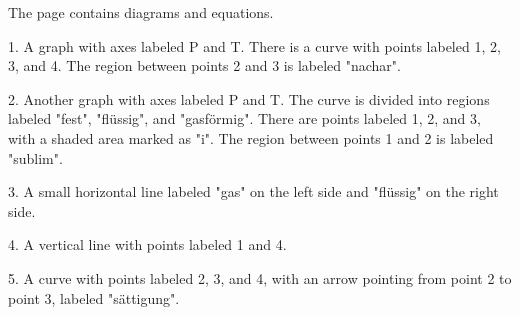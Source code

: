 The page contains diagrams and equations. 

1. A graph with axes labeled P and T. There is a curve with points labeled 1, 2, 3, and 4. The region between points 2 and 3 is labeled "nachar".

2. Another graph with axes labeled P and T. The curve is divided into regions labeled "fest", "flüssig", and "gasförmig". There are points labeled 1, 2, and 3, with a shaded area marked as "i". The region between points 1 and 2 is labeled "sublim".

3. A small horizontal line labeled "gas" on the left side and "flüssig" on the right side.

4. A vertical line with points labeled 1 and 4.

5. A curve with points labeled 2, 3, and 4, with an arrow pointing from point 2 to point 3, labeled "sättigung".